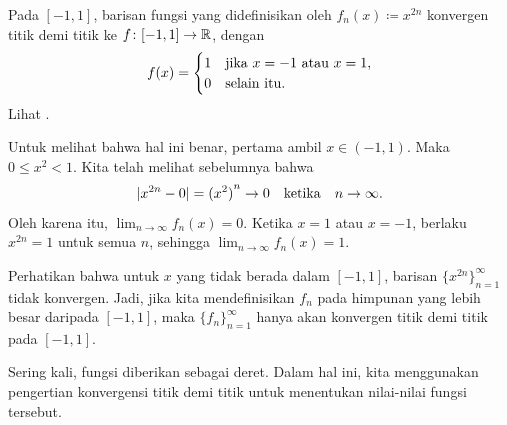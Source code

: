 \begin{example}
Pada $[-1,1]$, barisan fungsi yang didefinisikan oleh $f_n(x) \coloneqq x^{2n}$
konvergen titik demi titik ke $f \colon [-1,1] \to {\mathbb{R}}$, dengan
\begin{equation*}
f(x) =
\begin{cases}
1 & \text{jika } x=-1 \text{ atau } x=1, \\
0 & \text{selain itu.}
\end{cases}
\avoidbreak
\end{equation*}
Lihat .

\begin{myfigureht}
\caption{Grafik $f_1$, $f_2$, $f_3$, dan $f_8$ untuk $f_n(x) \coloneqq
x^{2n}$.\label{x2nfig}}
\end{myfigureht}

Untuk melihat bahwa hal ini benar, pertama ambil $x \in (-1,1)$.  Maka
$0 \leq x^2 < 1$.
Kita telah melihat sebelumnya bahwa
\begin{equation*}
\lvert {x^{2n} - 0} \rvert = {(x^2)}^n \to 0 \quad \text{ketika} \quad n \to \infty .
\end{equation*}
Oleh karena itu, $\lim_{n\to\infty}f_n(x) = 0$.
Ketika $x = 1$ atau $x=-1$, berlaku $x^{2n} = 1$ untuk semua $n$, sehingga
$\lim_{n\to\infty}f_n(x) = 1$.

Perhatikan bahwa untuk $x$ yang tidak berada dalam $[-1,1]$, barisan
$\{ x^{2n} \}_{n=1}^\infty$ tidak konvergen.
Jadi, jika kita mendefinisikan $f_n$ pada himpunan yang lebih besar daripada $[-1,1]$,
maka $\{ f_n \}_{n=1}^\infty$
hanya akan konvergen titik demi titik pada $[-1,1]$.
\end{example}

Sering kali, fungsi diberikan sebagai deret.  Dalam hal ini, kita menggunakan
pengertian konvergensi titik demi titik untuk menentukan nilai-nilai fungsi tersebut.

